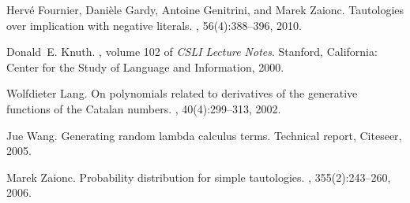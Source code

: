 \documentclass[preprint,authoryear]{elsarticle}
\begin{document}
\begin{thebibliography}{10}
Herv{\'e} Fournier, Dani{\`e}le Gardy, Antoine Genitrini, and Marek Zaionc.
\newblock Tautologies over implication with negative literals.
, 56(4):388--396, 2010.

Donald~E. Knuth.
, volume 102 of {\em
  CSLI Lecture Notes}.
\newblock Stanford, California: Center for the Study of Language and
  Information, 2000.

Wolfdieter Lang.
\newblock On polynomials related to derivatives of the generative functions of
  the {Catalan} numbers.
, 40(4):299--313, 2002.

Jue Wang.
\newblock Generating random lambda calculus terms.
\newblock Technical report, Citeseer, 2005.

Marek Zaionc.
\newblock Probability distribution for simple tautologies.
, 355(2):243--260, 2006.

\end{thebibliography}
\end{document}

